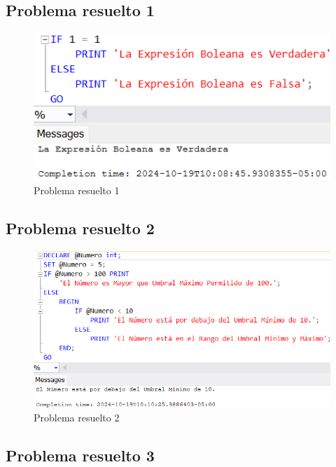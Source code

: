\subsection{Problema resuelto 1}

\begin{figure}[H]
  \centering
  \includegraphics{Imagenes/probs_resueltos/pr1.png}
  \caption{Problema resuelto 1}
\end{figure}

\subsection{Problema resuelto 2}

\begin{figure}[H]
  \centering
  \includegraphics[scale = 0.5]{Imagenes/probs_resueltos/pr2.png}
  \caption{Problema resuelto 2}
\end{figure}

\subsection{Problema resuelto 3}

